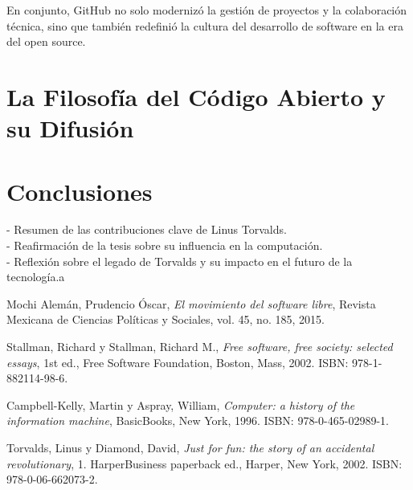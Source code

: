 \documentclass[a4paper,12pt]{article}
\begin{document}
En conjunto, GitHub no solo modernizó la gestión de proyectos y la colaboración
técnica, sino que también redefinió la cultura del desarrollo de software en la
era del open source.



\section{La Filosofía del Código Abierto y su Difusión} 



\section{Conclusiones} 
- Resumen de las contribuciones clave de Linus
Torvalds.\\ 
- Reafirmación de la tesis sobre su influencia en la computación.\\

- Reflexión sobre el legado de Torvalds y su impacto en el futuro de la
tecnología.a
\newpage

\begin{thebibliography}{9}

Mochi Alemán, Prudencio Óscar, \textit{El movimiento del software libre}, Revista Mexicana de Ciencias Políticas y Sociales, vol. 45, no. 185, 2015.

Stallman, Richard y Stallman, Richard M., \textit{Free software, free society: selected essays}, 1st ed., Free Software Foundation, Boston, Mass, 2002. ISBN: 978-1-882114-98-6.

Campbell-Kelly, Martin y Aspray, William, \textit{Computer: a history of the information machine}, BasicBooks, New York, 1996. ISBN: 978-0-465-02989-1.

Torvalds, Linus y Diamond, David, \textit{Just for fun: the story of an accidental revolutionary}, 1. HarperBusiness paperback ed., Harper, New York, 2002. ISBN: 978-0-06-662073-2.

\end{thebibliography}
\end{document}
